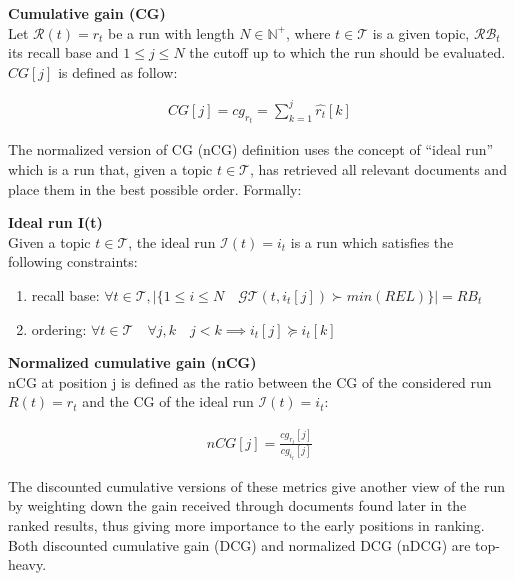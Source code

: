 \begin{definition}{\textbf{Cumulative gain (CG)}}\\

Let $\mathcal{R}(t)=r_t$ be a run with length $N \in \mathbb{N}^+$, where $t \in \mathcal{T}$ is a given topic, $\mathcal{RB}_t$ its recall base and $1 \leq j \leq N$ the cutoff up to which the run should be evaluated. $CG[j]$ is defined as follow:

\begin{align*}
CG[j] = cg_{r_t} = \sum_{k = 1}^j \hat{r_t}[k]
\end{align*}

\end{definition}

The normalized version of CG (nCG) definition uses the concept of ``ideal run'' which is a run that, given a topic $t \in \mathcal{T}$, has retrieved all relevant documents and place them in the best possible order. Formally:

\begin{definition}{\textbf{Ideal run I(t)}}\\

Given a topic $t \in \mathcal{T}$, the ideal run $\mathcal{I}(t)=i_t$ is a run which satisfies the following constraints:

\begin{enumerate}
    \item recall base: $\forall t \in \mathcal{T}, |\{ 1 \leq i \leq N \quad \mathcal{GT}(t, i_t[j]) \succ min(REL) \}| = RB_t$
    \item ordering: $\forall t \in \mathcal{T} \quad \forall j,k \quad j < k \implies i_t[j] \succeq i_t[k]$
\end{enumerate}

\end{definition}

\begin{definition}{\textbf{Normalized cumulative gain (nCG)}}\\

nCG at position j is defined as the ratio between the CG of the considered run $R(t)=r_t$ and the CG of the ideal run $\mathcal{I}(t)=i_t$:

\begin{align*}
nCG[j] = \frac{cg_{r_t}[j]}{cg_{i_t}[j]}
\end{align*}

\end{definition}

The discounted cumulative versions of these metrics give another view of the run by weighting down the gain received through documents found later in the ranked results, thus giving more
importance to the early positions in ranking. Both discounted cumulative gain (DCG) and normalized DCG (nDCG) are top-heavy.

